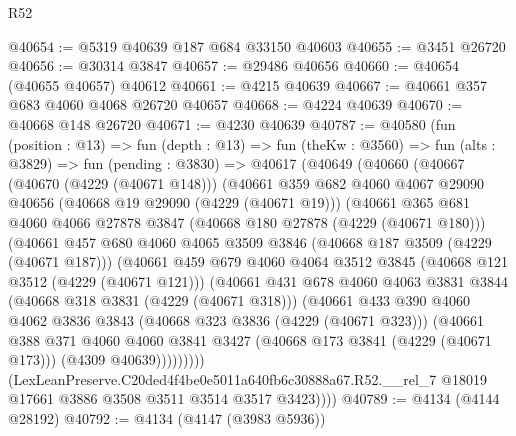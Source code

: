 \begin{lexlean}{R52}
\begin{coremodule}
@40654 := @5319 @40639 @187 @684 @33150 @40603
@40655 := @3451 @26720
@40656 := @30314 @3847
@40657 := @29486 @40656
@40660 := @40654 (@40655 @40657) @40612
@40661 := @4215 @40639
@40667 := @40661 @357 @683 @4060 @4068 @26720 @40657
@40668 := @4224 @40639
@40670 := @40668 @148 @26720
@40671 := @4230 @40639
@40787 := @40580
    (fun (position : @13) =>
    fun (depth : @13) =>
    fun (theKw : @3560) =>
    fun (alts : @3829) =>
    fun (pending : @3830) =>
    @40617
      (@40649
        (@40660
          (@40667
            (@40670 (@4229 (@40671 @148)))
            (@40661
              @359
              @682
              @4060
              @4067
              @29090
              @40656
              (@40668 @19 @29090 (@4229 (@40671 @19)))
              (@40661
                @365
                @681
                @4060
                @4066
                @27878
                @3847
                (@40668 @180 @27878 (@4229 (@40671 @180)))
                (@40661
                  @457
                  @680
                  @4060
                  @4065
                  @3509
                  @3846
                  (@40668 @187 @3509 (@4229 (@40671 @187)))
                  (@40661
                    @459
                    @679
                    @4060
                    @4064
                    @3512
                    @3845
                    (@40668 @121 @3512 (@4229 (@40671 @121)))
                    (@40661
                      @431
                      @678
                      @4060
                      @4063
                      @3831
                      @3844
                      (@40668 @318 @3831 (@4229 (@40671 @318)))
                      (@40661
                        @433
                        @390
                        @4060
                        @4062
                        @3836
                        @3843
                        (@40668 @323 @3836 (@4229 (@40671 @323)))
                        (@40661
                          @388
                          @371
                          @4060
                          @4060
                          @3841
                          @3427
                          (@40668 @173 @3841 (@4229 (@40671 @173)))
                          (@4309 @40639)))))))))
          (LexLeanPreserve.C20ded4f4be0e5011a640fb6c30888a67.R52.__rel_7
            @18019
            @17661
            @3886
            @3508
            @3511
            @3514
            @3517
            @3423))))
@40789 := @4134 (@4144 @28192)
@40792 := @4134 (@4147 (@3983 @5936))

\end{coremodule}
\end{lexlean}
